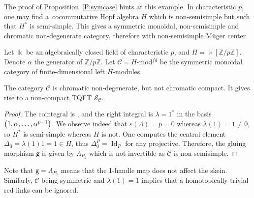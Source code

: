 \documentclass[pdftex]{sigma}
\numberwithin{equation}{section}
\newcommand{\gm}{{\mathsf{g}}}
\numberwithin{theorem}{section}
\numberwithin{proposition}{section}
\numberwithin{definition}{section}
\numberwithin{lemma}{section}
\numberwithin{corollary}{section}
\numberwithin{remark}{section}
\numberwithin{example}{section}
\newcommand{\cat}{\mathcal{C}}
\newcommand{\Z}{\ensuremath{\mathbb{Z}}}
\newcommand{\unit}{\ensuremath{\mathds{1}}}
\newcommand{\Id}{\operatorname{Id}}
\newcommand{\FK}{{\Bbbk}}
\newcommand{\TSkein}{{\mathscr{S}}}
\begin{document}
The proof of Proposition~\ref{P:symcase} hints at this example. In
characteristic $p$, one may find a~cocommutative Hopf algebra $H$
which is non-semisimple but such that $H^*$ is semi-simple. This gives
a symmetric monoidal, non-semisimple and chromatic non-degenerate
category, therefore with non-semisimple M\"uger center.
\begin{definition}
 Let $\FK$ be an algebraically closed field of characteristic $p$, and
 $H=\FK[\Z/p\Z]$. Denote $\alpha$ the generator of $\Z/p\Z$. Let
 $\cat = H$-mod$^{fd}$ be the symmetric monoidal category of finite-dimensional left $H$-modules.
\end{definition}
\begin{proposition}
 The category $\cat$ is chromatic non-degenerate, but not chromatic
 compact. It
 gives rise to a non-compact TQFT $\TSkein_\cat$.
\end{proposition}
\begin{proof}
 The cointegral is , and the right
 integral is $\lambda=1^*$ in the basis
 $\bigl(1,\alpha,\dots,\allowbreak \smash{\alpha^{p-1}\bigr)}$. We observe indeed that
 $\varepsilon(\Lambda)=p=0$ whereas $\lambda(1)=1\neq 0$, so $H^*$ is
 semi-simple whereas $H$ is not. One computes the central element
 $\Delta_0= \lambda(1)1=1\in H$, thus $\Delta_0^P=\Id_P$
 for any projective. Therefore, the gluing morphism $\gm$ is given by
 $\Lambda_{P_\unit}$ which is not invertible as $\cat$ is
 non-semisimple.
\end{proof}

Note that $\gm=\Lambda_{P_\unit}$ means that the 1-handle map does not
affect the skein. Similarly, $\cat$ being symmetric and $\lambda(1)=1$
implies that a homotopically-trivial red links can be ignored.
\end{document}
